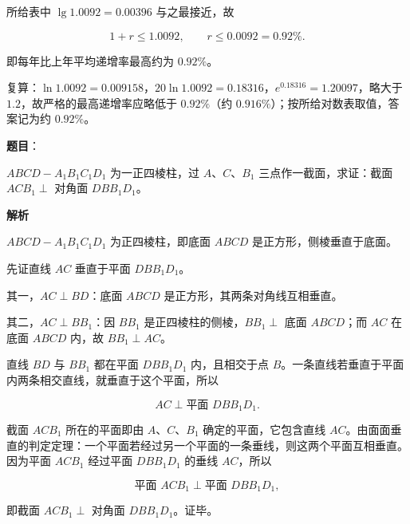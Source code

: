 \begin{answer}
所给表中 $\lg1.0092=0.00396$ 与之最接近，故

\nopagebreak[4]
\[
1+r\leqslant1.0092,\qquad r\leqslant0.0092=0.92\%.
\]

即每年比上年平均递增率最高约为 $0.92\%$。

复算：$\ln1.0092=0.009158$，$20\ln1.0092=0.18316$，$e^{0.18316}=1.20097$，略大于 $1.2$，故严格的最高递增率应略低于 $0.92\%$（约 $0.916\%$）；按所给对数表取值，答案记为约 $0.92\%$。



\end{answer}
\begin{answer}

\textbf{题目}：

$ABCD-A_1B_1C_1D_1$ 为一正四棱柱，过 $A$、$C$、$B_1$ 三点作一截面，求证：截面 $ACB_1\perp$ 对角面 $DBB_1D_1$。

\textbf{解析}

$ABCD-A_1B_1C_1D_1$ 为正四棱柱，即底面 $ABCD$ 是正方形，侧棱垂直于底面。

先证直线 $AC$ 垂直于平面 $DBB_1D_1$。

其一，$AC\perp BD$：底面 $ABCD$ 是正方形，其两条对角线互相垂直。

其二，$AC\perp BB_1$：因 $BB_1$ 是正四棱柱的侧棱，$BB_1\perp$ 底面 $ABCD$；而 $AC$ 在底面 $ABCD$ 内，故 $BB_1\perp AC$。

直线 $BD$ 与 $BB_1$ 都在平面 $DBB_1D_1$ 内，且相交于点 $B$。一条直线若垂直于平面内两条相交直线，就垂直于这个平面，所以

\nopagebreak[4]
\[
AC\perp\text{平面 }DBB_1D_1.
\]

截面 $ACB_1$ 所在的平面即由 $A$、$C$、$B_1$ 确定的平面，它包含直线 $AC$。由面面垂直的判定定理：一个平面若经过另一个平面的一条垂线，则这两个平面互相垂直。因为平面 $ACB_1$ 经过平面 $DBB_1D_1$ 的垂线 $AC$，所以

\nopagebreak[4]
\[
\text{平面 }ACB_1\perp\text{平面 }DBB_1D_1,
\]

即截面 $ACB_1\perp$ 对角面 $DBB_1D_1$。证毕。


\end{answer}
